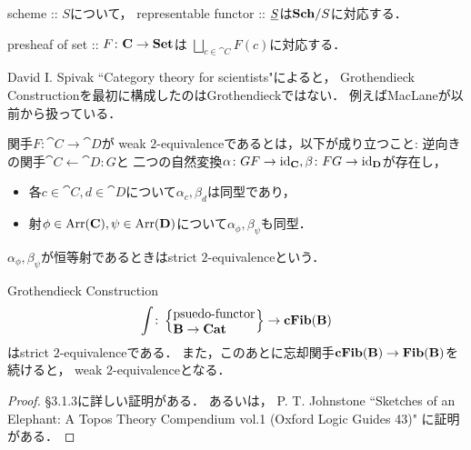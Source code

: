     \begin{Example}
        scheme :: $S$について，
        representable functor :: $\ftor{S}$は$\Sch/S$に対応する．
    \end{Example}

    \begin{Example}
        presheaf of set :: $F \colon \cat{C} \to \Set$は
        $\bigsqcup_{c \in \cat{C}} F(c)$に対応する．
    \end{Example}

    \begin{Remark}
        David I. Spivak ``Category theory for scientists"によると，
        Grothendieck Constructionを最初に構成したのはGrothendieckではない．
        例えばMacLaneが以前から扱っている．
    \end{Remark}

    \begin{Def}
        関手$F \colon \cat{C} \rightarrow \cat{D}$が
        weak $2$-equivalenceであるとは，以下が成り立つこと:
        逆向きの関手$\cat{C} \leftarrow \cat{D} \colon G$と
        二つの自然変換$\alpha \colon GF \to \id[\cat{C}], \beta \colon FG \to \id[\cat{D}]$が存在し，
        \begin{itemize}
            \item 各$c \in \cat{C}, d \in \cat{D}$について$\alpha_{c}, \beta_{d}$は同型であり，
            \item 射$\phi \in \Arr(\cat{C}), \psi \in \Arr(\cat{D})$について$\alpha_{\phi}, \beta_{\psi}$も同型．
        \end{itemize}
        $\alpha_{\phi}, \beta_{\psi}$が恒等射であるときはstrict $2$-equivalenceという．
    \end{Def}

    \begin{Thm}
        Grothendieck Construction
        \[
            \int \colon
            \left\{ \parbox{2.3cm}{psuedo-functor \\ \quad \ $\cat{B} \to \Cat$} \right\} \to \cFib{B}
        \]
        はstrict $2$-equivalenceである．
        また，このあとに忘却関手$\cFib{B} \to \Fib{B}$を続けると，
        weak $2$-equivalenceとなる．
    \end{Thm}
    \begin{proof}
        \cite{Vistoli07} \S 3.1.3に詳しい証明がある．
        あるいは，
        P. T. Johnstone
            ``Sketches of an Elephant: A Topos Theory Compendium vol.1 (Oxford Logic Guides 43)"
        に証明がある．
    \end{proof}
    
